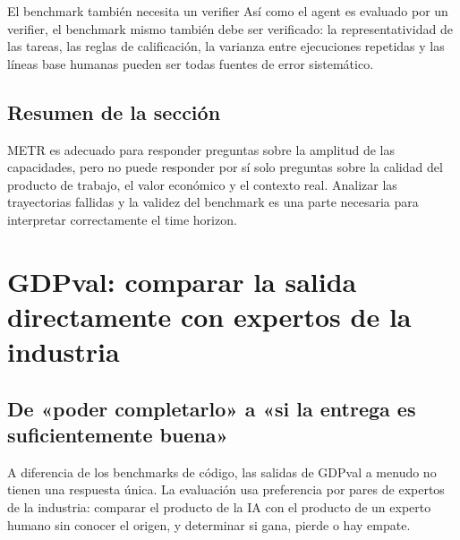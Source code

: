 \documentclass[a4paper]{article}
\begin{document}
\begin{importantbox}{El benchmark también necesita un verifier}
Así como el agent es evaluado por un verifier, el benchmark mismo también debe ser verificado: la representatividad de las tareas, las reglas de calificación, la varianza entre ejecuciones repetidas y las líneas base humanas pueden ser todas fuentes de error sistemático.
\end{importantbox}

\subsection{Resumen de la sección}

METR es adecuado para responder preguntas sobre la amplitud de las capacidades, pero no puede responder por sí solo preguntas sobre la calidad del producto de trabajo, el valor económico y el contexto real. Analizar las trayectorias fallidas y la validez del benchmark es una parte necesaria para interpretar correctamente el time horizon.
\section{GDPval: comparar la salida directamente con expertos de la industria}

\subsection{De «poder completarlo» a «si la entrega es suficientemente buena»}




A diferencia de los benchmarks de código, las salidas de GDPval a menudo no tienen una respuesta única. La evaluación usa preferencia por pares de expertos de la industria: comparar el producto de la IA con el producto de un experto humano sin conocer el origen, y determinar si gana, pierde o hay empate.
\end{document}

